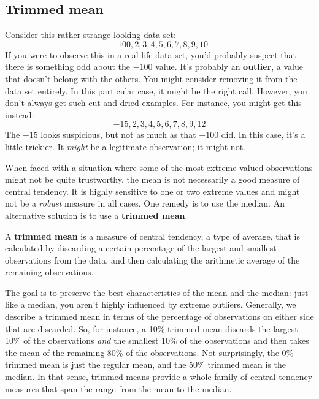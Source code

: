 \documentclass[
  11pt,
  a4paper,
  twoside,symmetric,openright]{book}
\theoremstyle{break}
\theoremstyle{break}
\begin{document}
\subsection{Trimmed mean}\label{trimmedmean}

\begin{example}[Outliers]
\protect\hypertarget{exm:exoutliers}{}\label{exm:exoutliers}Consider this rather strange-looking data set:
\[
-100,2,3,4,5,6,7,8,9,10
\]
If you were to observe this in a real-life data set, you'd probably suspect that there is something odd about the \(-100\) value. It's probably an \textbf{outlier}, a value that doesn't belong with the others. You might consider removing it from the data set entirely. In this particular case, it might be the right call. However, you don't always get such cut-and-dried examples. For instance, you might get this instead:
\[
-15,2,3,4,5,6,7,8,9,12
\]
The \(-15\) looks suspicious, but not as much as that \(-100\) did. In this case, it's a little trickier. It \emph{might} be a legitimate observation; it might not.
\end{example}

When faced with a situation where some of the most extreme-valued observations might not be quite trustworthy, the mean is not necessarily a good measure of central tendency. It is highly sensitive to one or two extreme values and might not be a \emph{robust} measure in all cases. One remedy is to use the median. An alternative solution is to use a \textbf{trimmed mean}.

\begin{definition}
\protect\hypertarget{def:deftrimmedmean}{}\label{def:deftrimmedmean}A \textbf{trimmed mean} is a measure of central tendency, a type of average, that is calculated by discarding a certain percentage of the largest and smallest observations from the data, and then calculating the arithmetic average of the remaining observations.
\end{definition}

The goal is to preserve the best characteristics of the mean and the median: just like a median, you aren't highly influenced by extreme outliers. Generally, we describe a trimmed mean in terms of the percentage of observations on either side that are discarded. So, for instance, a 10\% trimmed mean discards the largest 10\% of the observations \emph{and} the smallest 10\% of the observations and then takes the mean of the remaining 80\% of the observations. Not surprisingly, the 0\% trimmed mean is just the regular mean, and the 50\% trimmed mean is the median. In that sense, trimmed means provide a whole family of central tendency measures that span the range from the mean to the median.
\end{document}
